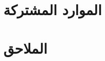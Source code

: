 \documentclass[12pt,a4paper]{report}
\begin{document}
\chapter{الموارد المشتركة}


%
%
%
%
%
%

\chapter{الملاحق}
%
%
%
\end{document}

